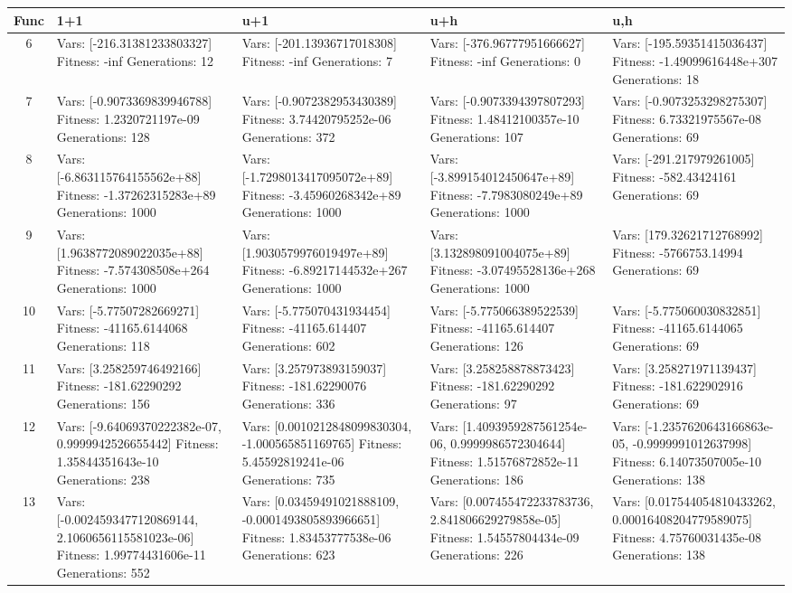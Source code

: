 \documentclass[landscape,11pt]{article}
\begin{document}
\begin{tabular}{|c|p{5.4cm}|p{5.4cm}|p{5.4cm}|p{5.4cm}|}
\hline
Func & 1+1 & u+1 & u+h & u,h \\ 
\hline 6 & Vars: [-216.31381233803327] Fitness: -inf Generations: 12 & Vars: [-201.13936717018308] Fitness: -inf Generations: 7 & Vars: [-376.96777951666627] Fitness: -inf Generations: 0 & Vars: [-195.59351415036437] Fitness: -1.49099616448e+307 Generations: 18 \\
 \hline 
 7 & Vars: [-0.9073369839946788] Fitness: 1.2320721197e-09 Generations: 128 & Vars: [-0.9072382953430389] Fitness: 3.74420795252e-06 Generations: 372 & Vars: [-0.9073394397807293] Fitness: 1.48412100357e-10 Generations: 107 & Vars: [-0.9073253298275307] Fitness: 6.73321975567e-08 Generations: 69 \\
 \hline 
 8 & Vars: [-6.863115764155562e+88] Fitness: -1.37262315283e+89 Generations: 1000 & Vars: [-1.7298013417095072e+89] Fitness: -3.45960268342e+89 Generations: 1000 & Vars: [-3.899154012450647e+89] Fitness: -7.7983080249e+89 Generations: 1000 & Vars: [-291.217979261005] Fitness: -582.43424161 Generations: 69 \\
 \hline 
 9 & Vars: [1.9638772089022035e+88] Fitness: -7.574308508e+264 Generations: 1000 & Vars: [1.9030579976019497e+89] Fitness: -6.89217144532e+267 Generations: 1000 & Vars: [3.132898091004075e+89] Fitness: -3.07495528136e+268 Generations: 1000 & Vars: [179.32621712768992] Fitness: -5766753.14994 Generations: 69 \\
 \hline 
 10 & Vars: [-5.77507282669271] Fitness: -41165.6144068 Generations: 118 & Vars: [-5.775070431934454] Fitness: -41165.614407 Generations: 602 & Vars: [-5.775066389522539] Fitness: -41165.614407 Generations: 126 & Vars: [-5.775060030832851] Fitness: -41165.6144065 Generations: 69 \\
 \hline 
 11 & Vars: [3.258259746492166] Fitness: -181.62290292 Generations: 156 & Vars: [3.257973893159037] Fitness: -181.62290076 Generations: 336 & Vars: [3.258258878873423] Fitness: -181.62290292 Generations: 97 & Vars: [3.258271971139437] Fitness: -181.622902916 Generations: 69 \\
 \hline 
 12 & Vars: [-9.64069370222382e-07, 0.9999942526655442] Fitness: 1.35844351643e-10 Generations: 238 & Vars: [0.0010212848099830304, -1.000565851169765] Fitness: 5.45592819241e-06 Generations: 735 & Vars: [1.4093959287561254e-06, 0.9999986572304644] Fitness: 1.51576872852e-11 Generations: 186 & Vars: [-1.2357620643166863e-05, -0.9999991012637998] Fitness: 6.14073507005e-10 Generations: 138 \\
 \hline 
 13 & Vars: [-0.0024593477120869144, 2.1060656115581023e-06] Fitness: 1.99774431606e-11 Generations: 552 & Vars: [0.03459491021888109, -0.0001493805893966651] Fitness: 1.83453777538e-06 Generations: 623 & Vars: [0.007455472233783736, 2.841806629279858e-05] Fitness: 1.54557804434e-09 Generations: 226 & Vars: [0.017544054810433262, 0.00016408204779589075] Fitness: 4.75760031435e-08 Generations: 138 \\
 \hline 
\end{tabular}
\end{document}
